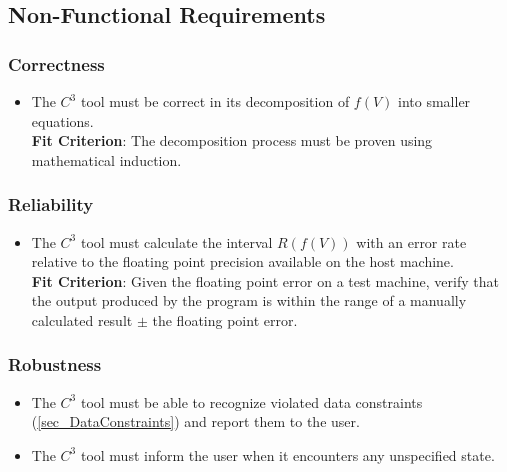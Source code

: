 \documentclass[12pt]{article}
\newcommand{\prognameAbbrv}{$C^{3}$}
\begin{document}

\subsection{Non-Functional Requirements}

\subsubsection*{Correctness}
\begin{itemize}
	\item The \prognameAbbrv{} tool must be correct in its decomposition of 
	$f(V)$ into smaller equations.\\ \textbf{Fit Criterion}: The decomposition 
	process must be proven using mathematical induction.
\end{itemize}

\subsubsection*{Reliability}
\begin{itemize}
	\item The \prognameAbbrv{} tool must calculate the interval $R(f(V))$ with 
	an error rate relative to the floating point precision available on the 
	host machine. \\ \textbf{Fit Criterion}: Given the floating point error on 
	a test machine, verify that the output produced by the program is within 
	the range of a manually calculated result $\pm$ the floating point error.
\end{itemize}

\subsubsection*{Robustness}
\begin{itemize}
	\item The \prognameAbbrv{} tool must be able to recognize violated data 
	constraints (\ref{sec_DataConstraints}) and report them to the user.
	\item The \prognameAbbrv{} tool must inform the user when it encounters any 
	unspecified state.
\end{itemize}
\end{document}
